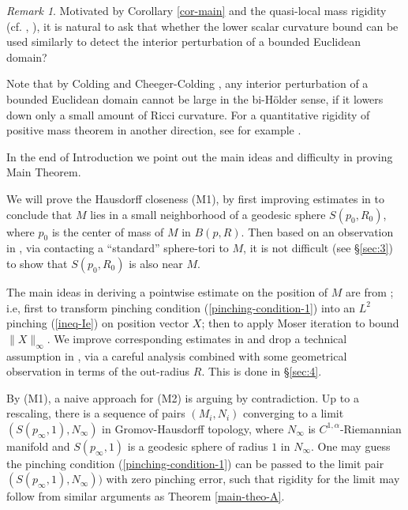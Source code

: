 \documentclass{amsart}
\numberwithin{equation}{section}
\theoremstyle{remark}
\newtheorem{rem}[theo]{Remark}
\renewcommand{\(}{\left(}
\renewcommand{\)}{\right)}
\renewcommand{\~}{\tilde}
\renewcommand{\-}{\overline}
\begin{document}
\begin{rem}
	Motivated by Corollary \ref{cor-main} and the quasi-local mass rigidity (cf. \cite{Yau2001}, \cite{Shi-Tam2002}), it is natural to ask that whether the lower scalar curvature bound can be used similarly to detect the interior perturbation of a bounded Euclidean domain? 
	
	Note that by Colding \cite{Colding1997} and Cheeger-Colding \cite{Cheeger-Colding1997}, any interior perturbation of a bounded Euclidean domain cannot be large in the bi-H\"older sense, if it lowers down only a small amount of Ricci curvature. For a quantitative rigidity of positive mass theorem in another direction, see for example \cite{Sormani-Allen2019}.
\end{rem}






In the end of Introduction we point out the main ideas and difficulty in proving Main Theorem.

We will prove the Hausdorff closeness (M1), by first improving estimates in \cite{Grosjean-Roth2012} to conclude that $M$ lies in a small neighborhood of a geodesic sphere $S(p_0,R_0)$, where $p_0$ is the center of mass of $M$ in $B(p,R)$. Then based on an observation in \cite{Colbois-Grosjean2007}, via contacting a ``standard'' sphere-tori to $M$, it is not difficult (see \S \ref{sec:3}) to show that $S(p_0,R_0)$ is also near $M$.

The main ideas in deriving a pointwise estimate on the position of $M$ are from \cite{Colbois-Grosjean2007}; i.e, first to transform pinching condition (\ref{pinching-condition-1}) into an $L^2$ pinching (\ref{ineq-Ie}) on position vector $X$;  then to apply Moser iteration to bound $\|X\|_\infty$. We improve corresponding estimates in \cite{Grosjean-Roth2012} and drop a technical assumption in \cite{Grosjean-Roth2012}, via a careful analysis combined with some geometrical observation in terms of the out-radius $R$. This is done in \S \ref{sec:4}.

By (M1), a naive approach for (M2) is arguing by contradiction. Up to a rescaling, there is a sequence of pairs $(M_i,N_i)$ converging to a limit $(S(p_\infty,1), N_\infty)$ in Gromov-Hausdorff topology, where $N_\infty$ is $C^{1,\alpha}$-Riemannian manifold and $S(p_\infty,1)$ is a geodesic sphere of radius $1$ in $N_\infty$. One may guess the pinching condition (\ref{pinching-condition-1}) can be passed to the limit pair $(S(p_\infty,1), N_\infty))$ with zero pinching error, such that rigidity for the limit may follow from similar arguments as Theorem \ref{main-theo-A}.
\end{document}
